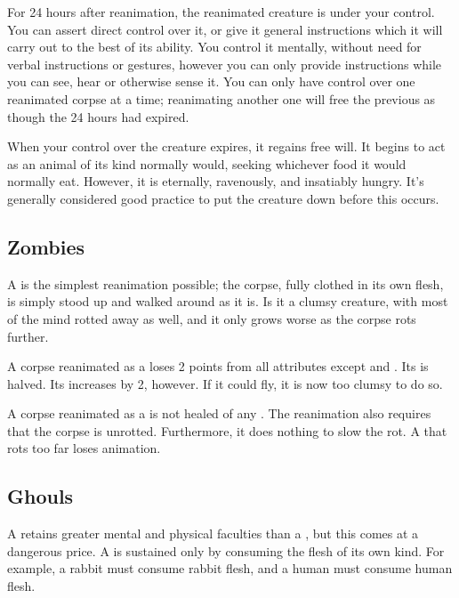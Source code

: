 For 24 hours after reanimation, the reanimated creature is under your control.
You can assert direct control over it, or give it general instructions which it will carry out to the best of its ability.
You control it mentally, without need for verbal instructions or gestures, however you can only provide instructions while you can see, hear or otherwise sense it.
You can only have control over one reanimated corpse at a time; reanimating another one will free the previous as though the 24 hours had expired.

When your control over the creature expires, it regains free will.
It begins to act as an animal of its kind normally would, seeking whichever food it would normally eat.
However, it is eternally, ravenously, and insatiably hungry.
It's generally considered good practice to put the creature down before this occurs.

\subsection{Zombies}

A  is the simplest reanimation possible; the corpse, fully clothed in its own flesh, is simply stood up and walked around as it is.
Is it a clumsy creature, with most of the mind rotted away as well, and it only grows worse as the corpse rots further.

A corpse reanimated as a  loses 2 points from all attributes except  and .
Its  is halved.
Its  increases by 2, however.
If it could fly, it is now too clumsy to do so.

A corpse reanimated as a  is not healed of any {\damage}.
The reanimation also requires that the corpse is unrotted.
Furthermore, it does nothing to slow the rot.
A  that rots too far loses animation.

\subsection{Ghouls}

A  retains greater mental and physical faculties than a , but this comes at a dangerous price.
A  is sustained only by consuming the flesh of its own kind.
For example, a rabbit  must consume rabbit flesh, and a human  must consume human flesh.

